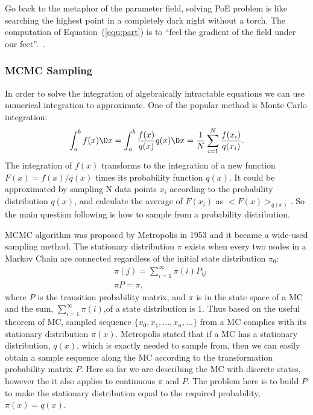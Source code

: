	Go back to the metaphor of the parameter field, solving PoE problem is like searching the highest point in a completely dark night without a torch.
	The computation of Equation~(\ref{equ:part}) is to ``feel the gradient of the field under our feet''.~\cite{woodfordnotes}.
\subsubsection{MCMC Sampling}
	\label{sec:mcmc}
	In order to solve the integration of algebraically intractable equations we can use numerical integration to approximate.
	One of the popular method is Monte Carlo integration:
	\begin{equation}
	\int_{a}^{b} f(x) \D x = \int_{a}^{b}\frac{f(x)}{q(x)}q(x)\D x = \dfrac{1}{N}\sum_{i=1}^{N}\frac{f(x_i)}{q(x_i)}.
	\end{equation}
	The integration of $ f(x) $ transforms to the integration of a new function $ F(x) = f(x)/q(x)  $ times its probability function $ q(x) $.
	It could be approximated by sampling N data points $ x_i $ according to the probability distribution $ q(x) $, and calculate the average of $ F(x_i) $ as $ <F(x)>_{q(x)}$.
	So the main question following is how to sample from a probability distribution.
	
	MCMC algorithm was proposed by Metropolis in 1953 and it became a wide-used sampling method.
	The stationary distribution $ \pi $ exists when every two nodes in a Markov Chain are connected regardless of the initial state distribution $ \pi_0 $:
	\begin{equation}
	\begin{aligned}
		&\pi(j) = \sum_{i=1}^{\infty}\pi(i)P_{ij} \\
		&\pi P = \pi,
	\end{aligned}
	\end{equation}
	where $ P $ is the transition probability matrix, and $ \pi $ is in the state space of a MC and the sum, $ \sum_{i=1}^{\infty}\pi(i) $,of a state distribution is 1.
	Thus based on the useful theorem of MC, sampled sequence $ \{x_0, x_1, ..., x_n, ... \}$ from a MC complies with its stationary distribution $ \pi(x) $.
	Metropolis stated that if a MC has a stationary distribution, $ q(x) $, which is exactly needed to sample from, then we can easily obtain a sample sequence along the MC according to the transformation probability matrix $ P $.
	Here so far we are describing the MC with discrete states, however the it also applies to continuous $ \pi $ and $ P $.
	The problem here is to build $ P $ to make the stationary distribution equal to the required probability, $ \pi(x) = q(x) $.
	
